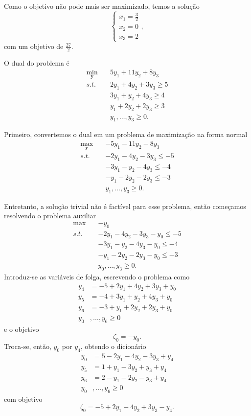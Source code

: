 \documentclass[a4paper]{report}
\begin{document}
Como o objetivo não pode mais ser maximizado, temos a solução \[
\begin{cases}
    x_1 = \frac{3}{2} \\
    x_2 = 0 \\
    x_3 = 2
\end{cases}
,\] 
com um objetivo de $\frac{27}{2}$.


O dual do problema é
\begin{align*}
    \min_{\bm{y}} \quad & 5y_1 + 11y_2 + 8y_3 \\
    s.t. \quad & 2y_1 + 4y_2 + 3y_3 \ge 5 \\
    \quad & 3y_1 + y_2 + 4y_3 \ge 4 \\
    \quad & y_1 + 2y_2 + 2y_3 \ge 3 \\
	  &y_1,\ldots,y_3 \ge 0
.\end{align*}



Primeiro, convertemos o dual em um problema de maximização na forma normal
\begin{align*}
    \max_{\bm{y}} \quad & -5y_1 - 11y_2 - 8y_3 \\
    s.t. \quad & -2y_1 - 4y_2 - 3y_3 \le -5 \\
    \quad & -3y_1 - y_2 - 4y_3 \le -4 \\
    \quad & -y_1 - 2y_2 - 2y_3 \le -3 \\
	  &y_1,\ldots,y_3 \ge 0
.\end{align*}

Entretanto, a solução trivial não é factível para esse problema, então começamos resolvendo o problema auxiliar
\begin{align*}
    \max \quad & -y_0 \\
    s.t. \quad & -2y_1 - 4y_2 - 3y_3 - y_0 \le -5 \\
    & -3y_1 - y_2 - 4y_3 - y_0 \le -4 \\
    & -y_1 - 2y_2 - 2y_3 -y_0 \le -3 \\
	  &y_0,\ldots,y_3 \ge 0
.\end{align*}
Introduz-se as variáveis de folga, escrevendo o problema como
\begin{align*}
    y_4 &= -5  +2y_1 + 4y_2 + 3y_3 +y_0 \\
    y_5 &= -4 +3y_1 + y_2 + 4y_3  +y_0 \\
    y_6 &= -3 + y_1 + 2y_2 + 2y_3 +y_0 \\
    y_0&,\ldots,y_6 \ge 0
\end{align*}
e o objetivo \[
\zeta_0 = -y_0
.\] 
Troca-se, então, $y_0$ por $y_4$, obtendo o dicionário
\begin{align*}
    y_0 &= 5  -2y_1 - 4y_2 - 3y_3 +y_4 \\
    y_5 &= 1 +y_1 -3y_2 +y_3  +y_4 \\
    y_6 &= 2 -y_1 -2y_2 -y_3 +y_4 \\
    y_0&,\ldots,y_6 \ge 0
\end{align*}
com objetivo \[
    \zeta_0 = -5  +2y_1 +4y_2 +3y_3 -y_4
.\] 
\end{document}
